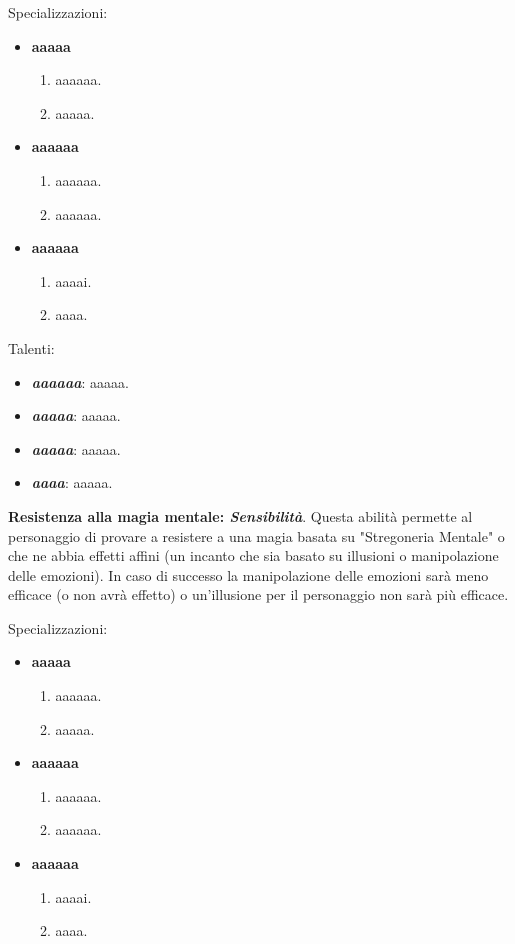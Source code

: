 \documentclass[../manuale_main.tex]{subfiles}
\begin{document}
Specializzazioni:
\begin{itemize} 
\item\textbf{aaaaa}
\begin{enumerate}
\item aaaaaa.
\item aaaaa.
\end{enumerate}

\item\textbf{aaaaaa}
\begin{enumerate}
\item aaaaaa.
\item aaaaaa.
\end{enumerate}

\item\textbf{aaaaaa}
\begin{enumerate}
\item aaaai.
\item aaaa.
\end{enumerate}

\end{itemize}

Talenti:
\begin{itemize}
\item \textbf{\textit{aaaaaa}}: aaaaa.
\item \textbf{\textit{aaaaa}}: aaaaa.
\item \textbf{\textit{aaaaa}}: aaaaa.
\item \textbf{\textit{aaaa}}: aaaaa.
\end{itemize}

\textbf{Resistenza alla magia mentale: \textit{Sensibilità}}. Questa abilità permette al personaggio di provare a resistere a una magia basata su "Stregoneria Mentale" o che ne abbia effetti affini (un incanto che sia basato su illusioni o manipolazione delle emozioni). In caso di successo la manipolazione delle emozioni sarà meno efficace (o non avrà effetto) o un'illusione per il personaggio non sarà più efficace.

Specializzazioni:
\begin{itemize} 
\item\textbf{aaaaa}
\begin{enumerate}
\item aaaaaa.
\item aaaaa.
\end{enumerate}

\item\textbf{aaaaaa}
\begin{enumerate}
\item aaaaaa.
\item aaaaaa.
\end{enumerate}

\item\textbf{aaaaaa}
\begin{enumerate}
\item aaaai.
\item aaaa.
\end{enumerate}

\end{itemize}
\end{document}
